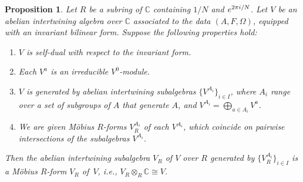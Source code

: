 \documentclass[11pt]{article}
\newcommand{\bC}{\mathbb{C}}
\newtheorem{prop}[thm]{Proposition}
\theoremstyle{definition}
\begin{document}
\begin{prop} \label{prop:existence-of-R-form-of-abelian-intertwining-algebra} Let $R$ be a subring of $\bC$ containing $1/N$ and ${\rm e}^{2\pi {\rm i}/N}$. Let $V$ be an abelian intertwining algebra over $\bC$ associated to the data $(A,F,\Omega)$, equipped with an invariant bilinear form. Suppose the following properties hold:
\begin{enumerate}\itemsep=0pt
\item[$1.$] $V$ is self-dual with respect to the invariant form.
\item[$2.$] Each $V^a$ is an irreducible $V^0$-module.
\item[$3.$] $V$ is generated by abelian intertwining subalgebras $\big\{V^{A_i}\big\}_{i \in I}$, where $A_i$ range over a set of subgroups of $A$ that generate $A$, and $V^{A_i} = \bigoplus_{a \in A_i} V^a$.
\item[$4.$] We are given M\"obius $R$-forms $V^{A_i}_R$ of each $V^{A_i}$, which coincide on pairwise intersections of the subalgebras $V^{A_i}$.
\end{enumerate}
Then the abelian intertwining subalgebra $V_R$ of $V$ over $R$ generated by $\big\{ V^{A_i}_R \big\}_{i \in I}$ is a M\"obius $R$-form $V_R$ of~$V$, i.e., $V_R \otimes_{R} \bC \cong V$.
\end{prop}
\end{document}

